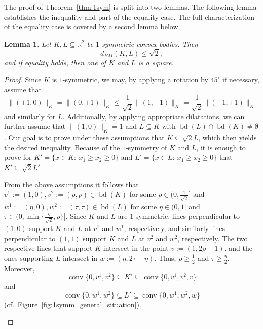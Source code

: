 \documentclass[12pt,a4paper]{article}
\newtheorem{lem}[twr]{Lemma}
\theoremstyle{definition}
\DeclareMathOperator{\conv}{conv}
\DeclareMathOperator{\bd}{bd}
\newcommand\R{\mathbb{R}}
\begin{document}
The proof of Theorem~\ref{thm:1sym} is split into two lemmas. The following lemma establishes the inequality and part of the equality case. The full characterization of the equality case is covered by a second lemma below.



\begin{lem}
\label{lem:1symm_ineq}
Let $K, L \subseteq \R^2$ be $1$-symmetric convex bodies. Then
$$ d_{BM}(K, L) \leq \sqrt{2}, $$
and if equality holds, then one of $K$ and $L$ is a square.
\end{lem}
\begin{proof}
Since $K$ is $1$-symmetric, we may, by applying a rotation by $45^\circ$ if necessary, assume that
$$\|(\pm 1, 0)\|_K = \|(0, \pm 1)\|_K \leq \frac{1}{\sqrt{2}} \|(1, \pm 1)\|_K = \frac{1}{\sqrt{2}} \|(-1, \pm 1)\|_K$$
and similarly for $L$. Additionally, by applying appropriate dilatations, we can further assume that $\|(1,0)\|_K = 1$ and $L \subseteq K$ with $\bd(L) \cap \bd(K) \neq \emptyset$. Our goal is to prove under these assumptions that $K \subseteq \sqrt{2} L$, which then yields the desired inequality. Because of the $1$-symmetry of $K$ and $L$, it is enough to prove for $K' = \{ x \in K: \ x_1 \geq x_2 \geq 0\}$ and $L'=\{ x \in L: \ x_1 \geq x_2 \geq 0\}$ that $K' \subseteq \sqrt{2}L'$.

From the above assumptions it follows that $v^1 := (1,0), v^2 := (\rho,\rho) \in \bd(K)$ for some $\rho \in (0,\frac{1}{\sqrt{2}}]$ and $w^1 := (\eta,0), w^2 := (\tau,\tau) \in \bd(L)$ for some $\eta \in (0,1]$ and $\tau \in (0,\min \{ \frac{\eta}{\sqrt{2}},\rho \}]$. Since $K$ and $L$ are $1$-symmetric, lines perpendicular to $(1,0)$ support $K$ and $L$ at $v^1$ and $w^1$, respectively, and similarly lines perpendicular to $(1,1)$ support $K$ and $L$ at $v^2$ and $w^2$, respectively. The two respective lines that support $K$ intersect in the point $v := (1, 2\rho - 1)$, and the ones supporting $L$ intersect in $w := (\eta, 2\tau - \eta)$. Thus, $\rho \geq \frac{1}{2}$ and $\tau \geq \frac{\eta}{2}$. Moreover,
$$ \conv \{ 0, v^1, v^2 \} \subseteq K' \subseteq \conv \{ 0, v^1, v^2, v \} $$
and
$$ \conv\{ 0, w^1, w^2 \} \subseteq L' \subseteq \conv \{ 0, w^1, w^2, w \} $$
(cf.~Figure~\ref{fig:1symm_general_situation}).
\newpage



\begin{figure}[ht]
\def\r{0.58}
\def\e{0.82}
\def\t{0.55}
\def\scale{4}
%
\centering
{}
\end{figure}
\end{proof}
\end{document}
